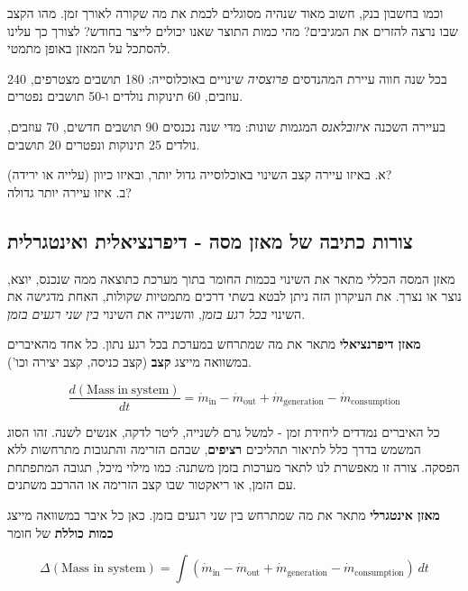 \documentclass[
  hebrew,
  letterpaper,
  DIV=11,
  numbers=noendperiod]{scrreprt}
\begin{document}
וכמו בחשבון בנק, חשוב מאוד שנהיה מסוגלים לכמת את מה שקורה לאורך זמן. מהו
הקצב שבו נרצה להזרים את המגיבים? מהי כמות התוצר שאנו יכולים לייצר בחודש?
לצורך כך עלינו להסתכל על המאזן באופן מתמטי.

בכל שנה חווה עיירת המהנדסים \emph{פרוצסיה} שינויים באוכלוסייה: 180
תושבים מצטרפים, 240 עוזבים, 60 תינוקות נולדים ו-50 תושבים נפטרים.

בעיירה השכנה \emph{איזובלאנס} המגמות שונות: מדי שנה נכנסים 90 תושבים
חדשים, 70 עוזבים, נולדים 25 תינוקות ונפטרים 20 תושבים.

א. באיזו עיירה קצב השינוי באוכלוסייה גדול יותר, ובאיזו כיוון (עלייה או
ירידה)?\\
ב. איזו עיירה יותר גדולה?

\subsection{צורות כתיבה של מאזן מסה - דיפרנציאלית
ואינטגרלית}\label{ux5e6ux5d5ux5e8ux5d5ux5ea-ux5dbux5eaux5d9ux5d1ux5d4-ux5e9ux5dc-ux5deux5d0ux5d6ux5df-ux5deux5e1ux5d4---ux5d3ux5d9ux5e4ux5e8ux5e0ux5e6ux5d9ux5d0ux5dcux5d9ux5ea-ux5d5ux5d0ux5d9ux5e0ux5d8ux5d2ux5e8ux5dcux5d9ux5ea}

מאזן המסה הכללי מתאר את השינוי בכמות החומר בתוך מערכת כתוצאה ממה שנכנס,
יוצא, נוצר או נצרך. את העיקרון הזה ניתן לבטא בשתי דרכים מתמטיות שקולות,
האחת מדגישה את השינוי \emph{בכל רגע בזמן}, והשנייה את השינוי \emph{בין
שני רגעים בזמן}.

\textbf{מאזן דיפרנציאלי} מתאר את מה שמתרחש במערכת בכל רגע נתון. כל אחד
מהאיברים במשוואה מייצג \textbf{קצב} (קצב כניסה, קצב יצירה וכו').

\[\frac{d\left( \text{Mass}\text{ }\text{in}\text{ }\text{system} \right)}{dt} = {\dot{m}}_{\text{in}} - {\dot{m}}_{\text{out}} + {\dot{m}}_{\text{generation}} - {\dot{m}}_{\text{consumption}}\]

כל האיברים נמדדים ליחידת זמן - למשל גרם לשנייה, ליטר לדקה, אנשים לשנה.
זהו הסוג המשמש בדרך כלל לתיאור תהליכים \textbf{רציפים}, שבהם הזרימה
והתגובות מתרחשות ללא הפסקה. צורה זו מאפשרת לנו לתאר מערכות בזמן משתנה:
כמו מילוי מיכל, תגובה המתפתחת עם הזמן, או ריאקטור שבו קצב הזרימה או
ההרכב משתנים.

\textbf{מאזן אינטגרלי} מתאר את מה שמתרחש בין שני רגעים בזמן. כאן כל איבר
במשוואה מייצג \textbf{כמות כוללת} של חומר

\[\Delta\left( \text{Mass in system} \right) = \int\left( {\dot{m}}_{\text{in}} - {\dot{m}}_{\text{out}} + {\dot{m}}_{\text{generation}} - {\dot{m}}_{\text{consumption}} \right)\text{ }dt\]
\end{document}
